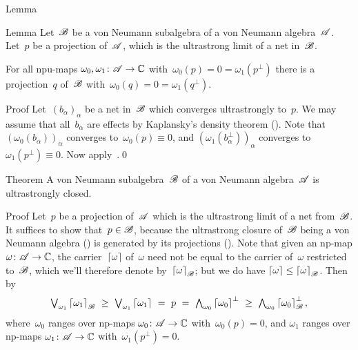 \documentclass[a]{subfiles}
\begin{document}
\begin{parsec}
\begin{point}{Lemma}
\end{point}
\begin{point}{Lemma}%
Let~$\mathscr{B}$ be a von Neumann subalgebra
of a von Neumann algebra~$\mathscr{A}$.
Let~$p$ be a projection of~$\mathscr{A}$,
which is the ultrastrong limit of a net in~$\mathscr{B}$.

For all npu-maps $\omega_0,\omega_1\colon \mathscr{A}\to\mathbb{C}$
with~$\omega_0(p)=0= \omega_1(p^\perp)$
there is a projection~$q$ of~$\mathscr{B}$
with~$\omega_0(q)=0=\omega_1(q^\perp)$.
\begin{point}{Proof}%
Let~$(b_\alpha)_\alpha$ be a net in~$\mathscr{B}$
which converges ultrastrongly to~$p$.
We may assume that all~$b_\alpha$
are effects
by Kaplansky's density theorem ().
Note that~$(\omega_0(b_\alpha))_\alpha$ converges to~$\omega_0(p)\equiv 0$,
and $(\omega_1(b^\perp_\alpha))_\alpha$ converges 
to~$\omega_1(p^\perp)\equiv 0$.
Now apply~.\qed
\end{point}
\end{point}
\begin{point}{Theorem}%
A von Neumann subalgebra~$\mathscr{B}$ of a von Neumann algebra~$\mathscr{A}$
is ultrastrongly closed.
\begin{point}{Proof}%
Let~$p$ be a projection of~$\mathscr{A}$ which is the ultrastrong limit
of a net from~$\mathscr{B}$. It suffices to show that~$p\in\mathscr{B}$,
because the ultrastrong closure of~$\mathscr{B}$
being a von Neumann algebra ()
is generated by its projections ().
Note that given an np-map $\omega\colon \mathscr{A}\to\mathbb{C}$,
the carrier~$\left\lceil\omega\right\rceil$ of~$\omega$
need not be equal to the carrier
of~$\omega$ restricted to~$\mathscr{B}$,
which we'll therefore denote by~$\left\lceil\omega\right\rceil_{\mathscr{B}}$;
but we do have $\left\lceil\omega\right\rceil\leq \left\lceil\omega\right\rceil_{\mathscr{B}}$.
Then by~
\begin{equation}
\label{ultracyclic-proof}
\textstyle
\bigvee_{\omega_1}
\ceil{\omega_1}_\scrB \ \geq\ 
\bigvee_{\omega_1}
\ceil{\omega_1}\ =\ p\ =\ 
\bigwedge_{\omega_0} \ceil{\omega_0}^\perp
\ \geq\ \bigwedge_{\omega_0} \ceil{\omega_0}_{\scrB}^\perp,
\end{equation}
where~$\omega_0$ ranges over np-maps $\omega_0\colon \mathscr{A}\to\mathbb{C}$
with~$\omega_0(p)=0$,
 and $\omega_1$ ranges over
np-maps $\omega_1\colon \mathscr{A}\to\mathbb{C}$ with~$\omega_1(p^\perp)=0$.

\end{point}
\end{point}
\end{parsec}
\end{document}
